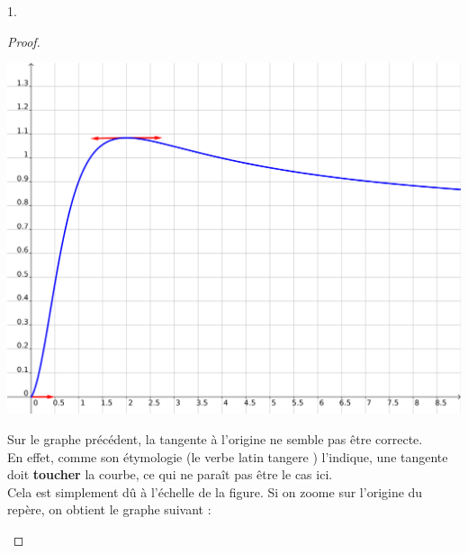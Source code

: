 \documentclass[11pt]{article}%
\begin{document}
\begin{noliste}{1.}
  \begin{proof}~
    \begin{center}
    
      
\includegraphics[scale=.25]{Figures/EML_2018/geogebra_EML_2018.png}
      
    \end{center}
    
    \begin{remark}
      Sur le graphe précédent, la tangente à l'origine ne semble pas
      être correcte.\\
      En effet, comme son étymologie (le verbe latin \og tangere
      \fg{}) l'indique, une tangente doit {\bf toucher} la courbe, ce
      qui ne paraît pas être le cas ici.\\
      Cela est simplement dû à l'échelle de la figure. Si on zoome sur
      l'origine du repère, on obtient le graphe suivant :
      \begin{center}
        

\end{center}
\end{remark}
\end{proof}
\end{noliste}
\end{document}
